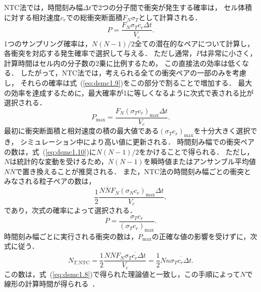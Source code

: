 NTC法では，時間刻み幅$\Delta t$で2つの分子間で衝突が発生する確率は，
セル体積に対する相対速度$c_r$での総衝突断面積$F_N\sigma_T$として計算される．
\begin{equation}
    P = \dfrac{F_N\sigma_Tc_r\Delta t}{V_c}.
    \label{eq:dsmc1.9}
\end{equation}
1つのサンプリング確率は，$N(N-1)/2$全ての潜在的なペアについて計算し，
各衝突を対応する発生確率で選択して与える．
ただし通常，$P$は非常に小さく，計算時間はセル内の分子数の2乗に比例するため，
この直接法の効率は低くなる．
したがって，NTC法では，考えられる全ての衝突ペアの一部のみを考慮し，
それらの確率は式~(\ref{eq:dsmc1.9})をこの部分で割ることで増加する．
最大の効率を達成するために，最大確率が1に等しくなるように次式で表される比が選択される．
\begin{equation}
    P_\mathrm{max} = \dfrac{F_N(\sigma_Tc_r)_\mathrm{max}\Delta t}{V_c}.
    \label{eq:dsmc1.10}
\end{equation}
最初に衝突断面積と相対速度の積の最大値である$(\sigma_Tc_r)_\mathrm{max}$を十分大きく選択でき，
シミュレーション中により高い値に更新される．
時間刻み幅での衝突ペアの数は，式~(\ref{eq:dsmc1.10})に$N(N-1)/2$をかけることで得られる．
ただし，$N$は統計的な変動を受けるため，$N(N-1)$を瞬時値またはアンサンブル平均値$N\overline{N}$で置き換えることが推奨される．
また，NTC法の時間刻み幅ごとの衝突とみなされる粒子ペアの数は，
\begin{equation}
    \dfrac{1}{2}\dfrac{N\overline{N}F_N(\sigma_Nc_r)_\mathrm{max}\Delta t}{V_c},
\end{equation}
であり，次式の確率によって選択される．
\begin{equation}
    P = \dfrac{\sigma_Tc_r}{(\sigma_Tc_r)_\mathrm{max}}.
\end{equation}
時間刻み幅ごとに実行される衝突の数は，$P_\mathrm{max}$の正確な値の影響を受けずに，次式に従う．
\begin{equation}
    N_{T,\mathrm{NTC}} = \dfrac{1}{2}\dfrac{N\overline{N}F_N\overline{\sigma_Tc_r\Delta t}}{V_c}
    = \dfrac{1}{2}Nn\overline{\sigma_Tc_r\Delta t}.
\end{equation}
この数は，式~(\ref{eq:dsmc1.8})で得られた理論値と一致し，この手順によって$N$で線形の計算時間が得られる~\cite{bird1994molecular}．




